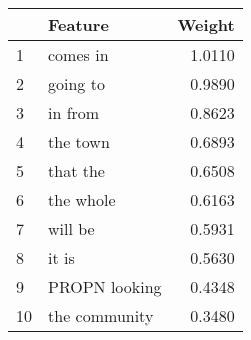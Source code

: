 \begin{tabular}{llr}
\toprule
{} &        Feature &  Weight \\
\midrule
1  &       comes in &  1.0110 \\
2  &       going to &  0.9890 \\
3  &        in from &  0.8623 \\
4  &       the town &  0.6893 \\
5  &       that the &  0.6508 \\
6  &      the whole &  0.6163 \\
7  &        will be &  0.5931 \\
8  &          it is &  0.5630 \\
9  &  PROPN looking &  0.4348 \\
10 &  the community &  0.3480 \\
\bottomrule
\end{tabular}
